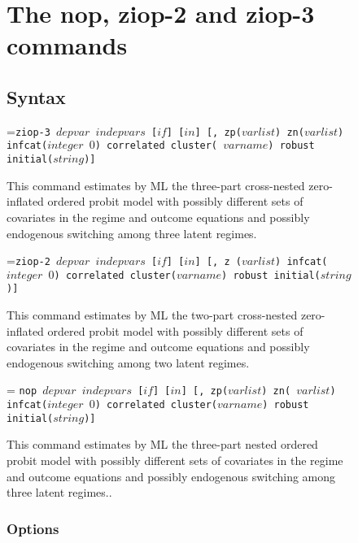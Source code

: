 \documentclass[letterpaper,fleqn,12pt]{article}
\begin{document}
\begin{figure}[H]
\begin{onehalfspace}
\section{The nop, ziop-2 and ziop-3 commands}

\subsection{Syntax}


\hangindent=\parindent\noindent \texttt{ziop-3 $depvar$ $indepvars$ [$if$] [$%
in$] [, zp($varlist$) zn($varlist$) infcat($integer$ $0$) correlated cluster(%
$varname$) robust initial($string$)] }

This command estimates by ML the three-part cross-nested zero-inflated
ordered probit model with possibly different sets of covariates in the
regime and outcome equations and possibly endogenous switching among three
latent regimes.

\hangindent=\parindent\noindent \texttt{ziop-2 $depvar$ $indepvars$ [$if$] [$%
in$] [, z ($varlist$) infcat($integer$ $0$) correlated cluster($varname$)
robust initial($string$)] }

This command estimates by ML the two-part cross-nested zero-inflated ordered
probit model with possibly different sets of covariates in the regime and
outcome equations and possibly endogenous switching among two latent regimes.

\hangindent=\parindent
\noindent \texttt{nop $depvar$ $indepvars$ [$if$] [$in$] [, zp($varlist$) zn(%
$varlist$) infcat($integer$ $0$) correlated cluster($varname$) robust
initial($string$)] }

This command estimates by ML the three-part nested ordered probit model with
possibly different sets of covariates in the regime and outcome equations
and possibly endogenous switching among three latent regimes..


\subsubsection*{Options}


\end{onehalfspace}
\end{figure}
\end{document}

